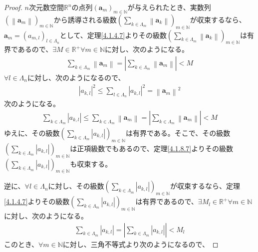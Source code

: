 \documentclass[dvipdfmx]{jsarticle}
\begin{document}
\begin{proof}
$n$次元数空間$\mathbb{R}^{n}$の点列$\left( \mathbf{a}_{m} \right)_{m \in \mathbb{N}}$が与えられたとき、実数列$\left( \left\| \mathbf{a}_{m} \right\| \right)_{m \in \mathbb{N}}$から誘導される級数$\left( \sum_{k \in \varLambda_{m}} \left\| \mathbf{a}_{k} \right\| \right)_{m \in \mathbb{N}}$が収束するなら、$\mathbf{a}_{m} = \left( a_{m,l} \right)_{l \in \varLambda_{n}}$として、定理\ref{4.1.4.7}よりその級数$\left( \sum_{k \in \varLambda_{m}} \left\| \mathbf{a}_{k} \right\| \right)_{m \in \mathbb{N}}$は有界であるので、$\exists M \in \mathbb{R}^{+}\forall m \in \mathbb{N}$に対し、次のようになる。
\begin{align*}
\sum_{k \in \varLambda_{m}} \left\| \mathbf{a}_{m} \right\| = \left| \sum_{k \in \varLambda_{m}} \left\| \mathbf{a}_{m} \right\| \right| < M
\end{align*}
$\forall l \in \varLambda_{n}$に対し、次のようになるので、
\begin{align*}
\left| a_{k,l} \right|^{2} \leq \sum_{l \in \varLambda_{n}} \left| a_{k,l} \right|^{2} = \left\| \mathbf{a}_{m} \right\|^{2}
\end{align*}
次のようになる。
\begin{align*}
\sum_{k \in \varLambda_{m}} \left| a_{k,l} \right| \leq \sum_{k \in \varLambda_{m}} \left\| \mathbf{a}_{m} \right\| = \left| \sum_{k \in \varLambda_{m}} \left\| \mathbf{a}_{m} \right\| \right| < M
\end{align*}
ゆえに、その級数$\left( \sum_{k \in \varLambda_{m}} \left| a_{k,l} \right| \right)_{m \in \mathbb{N}}$は有界である。そこで、その級数$\left( \sum_{k \in \varLambda_{m}} \left| a_{k,l} \right| \right)_{m \in \mathbb{N}}$は正項級数でもあるので、定理\ref{4.1.8.7}よりその級数$\left( \sum_{k \in \varLambda_{m}} \left| a_{k,l} \right| \right)_{m \in \mathbb{N}}$も収束する。\par
逆に、$\forall l \in \varLambda_{n}$に対し、その級数$\left( \sum_{k \in \varLambda_{m}} \left| a_{k,l} \right| \right)_{m \in \mathbb{N}}$が収束するなら、定理\ref{4.1.4.7}よりその級数$\left( \sum_{k \in \varLambda_{m}} \left| a_{k,l} \right| \right)_{m \in \mathbb{N}}$は有界であるので、$\exists M_{l} \in \mathbb{R}^{+}\forall m \in \mathbb{N}$に対し、次のようになる。
\begin{align*}
\sum_{k \in \varLambda_{m}} \left| a_{k,l} \right| = \left| \sum_{k \in \varLambda_{m}} \left| a_{k,l} \right| \right| < M_{l}
\end{align*}
このとき、$\forall m \in \mathbb{N}$に対し、三角不等式より次のようになるので、

\end{proof}
\end{document}
